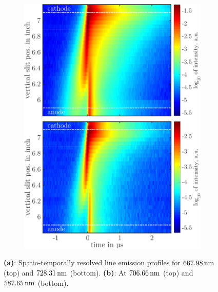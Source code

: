 \documentclass[a4paper,10pt,twoside]{article}
\newcommand{\fett}[1]{\textbf{#1}}
\begin{document}
\begin{figure}
\begin{subfigure}[t]{0.49\textwidth}
					\caption{}
					\label{img:667u728nm}
				\end{subfigure}
				\hfill
				\begin{subfigure}[t]{0.49\textwidth}
					\includegraphics[width=\textwidth]{figures/lineratio/combinations/korr706over587.pdf}
					\caption{}
					\label{img:706u587nm}
				\end{subfigure}
				\vspace{0.3cm}
				\caption{\fett{(a)}: Spatio-temporally resolved line emission profiles for $\unit[667.98]{nm}$ (top) and $\unit[728.31]{nm}$ (bottom). \fett{(b)}: At $\unit[706.66]{nm}$ (top) and $\unit[587.65]{nm}$ (bottom).}
				\label{img:comparisonemissionline}
			\end{figure}
	
\end{document}
